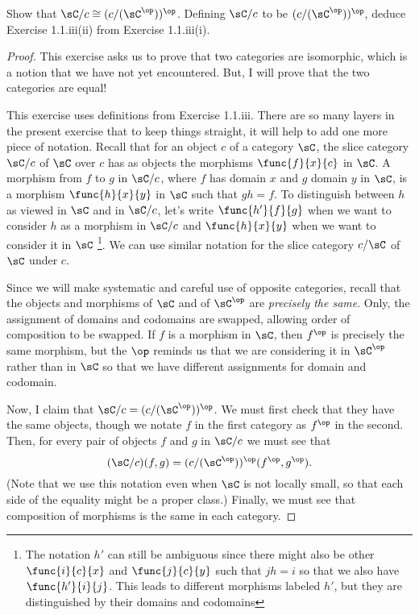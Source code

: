 \documentclass[main.tex]{subfiles}
\begin{document}
\begin{exercise}
Show that \(\sC/c\cong(c/(\sC^\op ))^\op\). Defining \(\sC/c\) to be
\((c/(\sC^\op))^\op\), deduce Exercise 1.1.iii(ii) from Exercise 1.1.iii(i).
\end{exercise}

\begin{proof}
This exercise asks us to prove that two categories are isomorphic, which is a
notion that we have not yet encountered. But, I will prove that the two
categories are equal!

This exercise uses definitions from Exercise 1.1.iii. There are so many layers
in the present exercise that to keep things straight, it will help to add one
more piece of notation. Recall that for an object \(c\) of a category \(\sC\),
the slice category \(\sC/c\) of \(\sC\) over \(c\) has as objects the morphisms
\(\func{f}{x}{c}\) in \(\sC\). A morphism from \(f\) to \(g\) in \(\sC/c\),
where \(f\) has domain \(x\) and \(g\) domain \(y\) in \(\sC\), is a morphism
\(\func{h}{x}{y}\) in \(\sC\) such that \(gh=f\). To distinguish between \(h\)
as viewed in \(\sC\) and in \(\sC/c\), let's write \(\func{h'}{f}{g}\)
when we want to consider \(h\) as a morphism in \(\sC/c\) and
\(\func{h}{x}{y}\) when we want to consider it in \(\sC\)%
\footnote{The notation \(h'\)
	can still be ambiguous since there might also be other \(\func{i}{c}{x}\)
	and \(\func{j}{c}{y}\) such that \(jh=i\) so that we also have
	\(\func{h'}{i}{j}\). This leads to different morphisms labeled \(h'\), but
they are distinguished by their domains and codomains}. We can use similar
notation for the slice category \(c/\sC\) of \(\sC\) under \(c\).

Since we will make systematic and careful use of opposite categories, recall
that the objects and morphisms of \(\sC\) and of \(\sC^\op\) are \emph{precisely
the same}. Only, the assignment of domains and codomains are swapped, allowing
order of composition to be swapped. If \(f\) is a morphism in \(\sC\), then
\(f^\op\) is precisely the same morphism, but the \(\op\) reminds us that we are
considering it in \(\sC^\op\) rather than in \(\sC\) so that we have different
assignments for domain and codomain.

Now, I claim that \(\sC/c=(c/(\sC^\op))^\op\). We must first check that they
have the same objects, though we notate \(f\) in the first category as \(f^\op\)
in the second. Then, for every pair of objects \(f\) and \(g\) in \(\sC/c\) we
must see that \[(\sC/c)(f,g)=(c/(\sC^\op))^\op(f^\op, g^\op).\] (Note that we
use this notation even when \(\sC\) is not locally small, so that each side of
the equality might be a proper class.) Finally, we must see that composition of
morphisms is the same in each category.


\end{proof}
\end{document}
